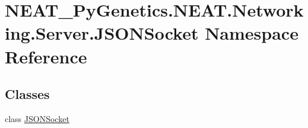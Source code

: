 \hypertarget{namespaceNEAT__PyGenetics_1_1NEAT_1_1Networking_1_1Server_1_1JSONSocket}{}\section{N\+E\+A\+T\+\_\+\+Py\+Genetics.\+N\+E\+A\+T.\+Networking.\+Server.\+J\+S\+O\+N\+Socket Namespace Reference}
\label{namespaceNEAT__PyGenetics_1_1NEAT_1_1Networking_1_1Server_1_1JSONSocket}
\subsection*{Classes}
\begin{DoxyCompactItemize}
\item 
class \hyperlink{classNEAT__PyGenetics_1_1NEAT_1_1Networking_1_1Server_1_1JSONSocket_1_1JSONSocket}{J\+S\+O\+N\+Socket}
\end{DoxyCompactItemize}
